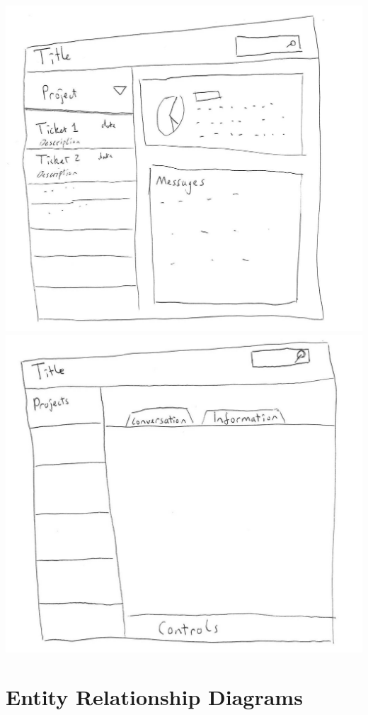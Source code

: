 \documentclass[a4paper]{l3proj}
\begin{document}
  \includegraphics[scale=0.15]{mockup1}
  \includegraphics[scale=0.15]{mockup2}


  \section{Entity Relationship Diagrams}
\end{document}
